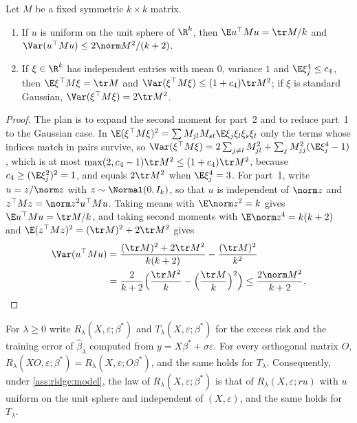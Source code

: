 \begin{refsection}
\begin{lemma}\label{lem:ridge:quad}
Let $M$ be a fixed symmetric $k\times k$ matrix.
\begin{enumerate}
\item If $u$ is uniform on the unit sphere of $\R^k$, then $\E u^\top Mu=\tr M/k$ and $\Var(u^\top Mu)\le2\norm M^2/(k+2)$.
\item If $\xi\in\R^k$ has independent entries with mean $0$, variance $1$ and $\E\xi_j^4\le c_4$, then $\E\xi^\top M\xi=\tr M$ and $\Var(\xi^\top M\xi)\le(1+c_4)\tr M^2$; if $\xi$ is standard Gaussian, $\Var(\xi^\top M\xi)=2\tr M^2$.
\end{enumerate}
\end{lemma}

\begin{proof}
The plan is to expand the second moment for part~2 and to reduce part~1 to the Gaussian case. In $\E(\xi^\top M\xi)^2=\sum M_{jl}M_{st}\E\xi_j\xi_l\xi_s\xi_t$ only the terms whose indices match in pairs survive, so $\Var(\xi^\top M\xi)=2\sum_{j\ne l}M_{jl}^2+\sum_jM_{jj}^2(\E\xi_j^4-1)$, which is at most $\max(2,c_4-1)\tr M^2\le(1+c_4)\tr M^2$, because $c_4\ge(\E\xi_j^2)^2=1$, and equals $2\tr M^2$ when $\E\xi_j^4=3$. For part~1, write $u=z/\norm z$ with $z\sim\Normal(0,I_k)$, so that $u$ is independent of $\norm z$ and $z^\top Mz=\norm z^2u^\top Mu$. Taking means with $\E\norm z^2=k$ gives $\E u^\top Mu=\tr M/k$, and taking second moments with $\E\norm z^4=k(k+2)$ and $\E(z^\top Mz)^2=(\tr M)^2+2\tr M^2$ gives
\begin{align*}
\Var(u^\top Mu)&=\frac{(\tr M)^2+2\tr M^2}{k(k+2)}-\frac{(\tr M)^2}{k^2}\\
&=\frac2{k+2}\Bigl(\frac{\tr M^2}k-\Bigl(\frac{\tr M}k\Bigr)^2\Bigr)\le\frac{2\norm M^2}{k+2}.\qedhere
\end{align*}
\end{proof}

\begin{lemma}\label{lem:ridge:rotation}
For $\lambda\ge0$ write $R_\lambda(X,\varepsilon;\beta^*)$ and $T_\lambda(X,\varepsilon;\beta^*)$ for the excess risk and the training error of $\hat\beta_\lambda$ computed from $y=X\beta^*+\sigma\varepsilon$. For every orthogonal matrix $O$, $R_\lambda(XO,\varepsilon;\beta^*)=R_\lambda(X,\varepsilon;O\beta^*)$, and the same holds for $T_\lambda$. Consequently, under \cref{ass:ridge:model}, the law of $R_\lambda(X,\varepsilon;\beta^*)$ is that of $R_\lambda(X,\varepsilon;ru)$ with $u$ uniform on the unit sphere and independent of $(X,\varepsilon)$, and the same holds for $T_\lambda$.
\end{lemma}


\end{refsection}
